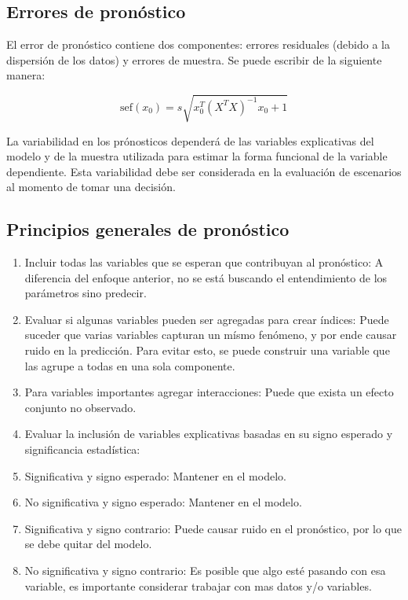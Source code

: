 \documentclass[
]{book}
\providecommand{\tightlist}{%
  \setlength{\itemsep}{0pt}\setlength{\parskip}{0pt}}
\begin{document}
\subsection{Errores de pronóstico}\label{errores-de-pronuxf3stico}

El error de pronóstico contiene dos componentes: errores residuales
(debido a la dispersión de los datos) y errores de muestra. Se puede
escribir de la siguiente manera:

\[\text{sef}(x_0) = s\sqrt{x_0^T(X^TX)^{-1}x_0 + 1}\]

La variabilidad en los prónosticos dependerá de las variables
explicativas del modelo y de la muestra utilizada para estimar la forma
funcional de la variable dependiente. Esta variabilidad debe ser
considerada en la evaluación de escenarios al momento de tomar una
decisión.

\subsection{Principios generales de pronóstico}\label{principios-generales-de-pronuxf3stico}

\begin{enumerate}
\def\labelenumi{\arabic{enumi}.}
\tightlist
\item
  Incluir todas las variables que se esperan que contribuyan al
  pronóstico: A diferencia del enfoque anterior, no se está buscando
  el entendimiento de los parámetros sino predecir.
\item
  Evaluar si algunas variables pueden ser agregadas para crear
  índices: Puede suceder que varias variables capturan un mísmo
  fenómeno, y por ende causar ruido en la predicción. Para evitar
  esto, se puede construir una variable que las agrupe a todas en una
  sola componente.
\item
  Para variables importantes agregar interacciones: Puede que exista
  un efecto conjunto no observado.
\item
  Evaluar la inclusión de variables explicativas basadas en su signo
  esperado y significancia estadística:
\item
  Significativa y signo esperado: Mantener en el modelo.
\item
  No significativa y signo esperado: Mantener en el modelo.
\item
  Significativa y signo contrario: Puede causar ruido en el
  pronóstico, por lo que se debe quitar del modelo.
\item
  No significativa y signo contrario: Es posible que algo esté pasando
  con esa variable, es importante considerar trabajar con mas datos
  y/o variables.
\end{enumerate}
\end{document}

